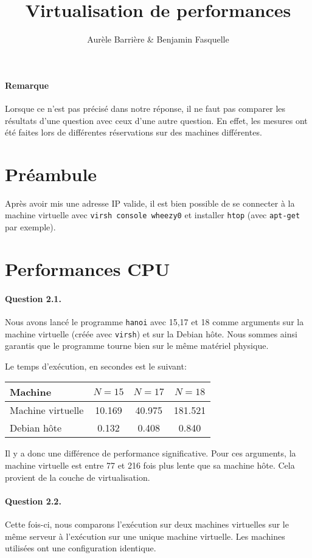 \documentclass[12pt]{article}
\title{Virtualisation de performances}
\author{Aurèle Barrière \& Benjamin Fasquelle}
\begin{document}
\maketitle
\def\code#1{\texttt{#1}}

\paragraph{Remarque} Lorsque ce n'est pas précisé dans notre réponse, il ne faut pas comparer les résultats d'une question avec ceux d'une autre question. En effet, les mesures ont été faites lors de différentes réservations sur des machines différentes.

\section{Préambule}
Après avoir mis une adresse IP valide, il est bien possible de se connecter à la machine virtuelle avec \code{virsh console wheezy0} et installer \code{htop} (avec \code{apt-get} par exemple).

\section{Performances CPU}

\paragraph{Question 2.1.} Nous avons lancé le programme \texttt{hanoi} avec 15,17 et 18 comme arguments sur la machine virtuelle (créée avec \code{virsh}) et sur la Debian hôte. Nous sommes ainsi garantis que le programme tourne bien sur le même matériel physique.

Le temps d'exécution, en secondes est le suivant:

\begin{tabular}{| l | c | c | c |}\hline
Machine & $N=15$ & $N=17$ & $N=18$ \\\hline
Machine virtuelle & 10.169 & 40.975 & 181.521 \\\hline
Debian hôte & 0.132 & 0.408 & 0.840\\\hline
\end{tabular}

Il y a donc une différence de performance significative. Pour ces arguments, la machine virtuelle est entre 77 et 216 fois plus lente que sa machine hôte. Cela provient de la couche de virtualisation.

\paragraph{Question 2.2.} 
Cette fois-ci, nous comparons l'exécution sur deux machines virtuelles sur le même serveur à l'exécution sur une unique machine virtuelle. Les machines utilisées ont une configuration identique.
\end{document}
